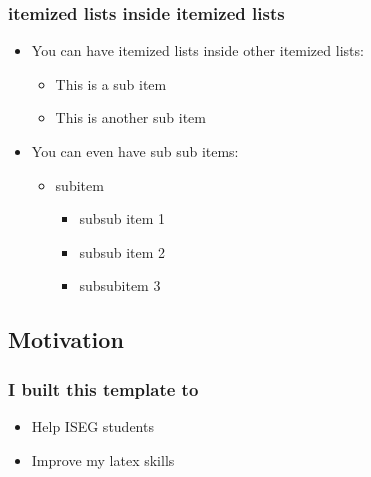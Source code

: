 \begin{frame}
	\frametitle{itemized lists inside itemized lists}
	
\begin{itemize}

\item You can have itemized lists inside other itemized lists:

\begin{itemize}

\item This is a sub item
\item This is another sub item

\end{itemize}

\item You can even have sub sub items:

\begin{itemize}

\item subitem

\begin{itemize}

\item subsub item 1
\item subsub item 2
\item subsubitem 3

\end{itemize}

\end{itemize}

\end{itemize}

\end{frame}


\subsection{Motivation}

\begin{frame}
	\frametitle{I built this template to}

\begin{itemize}

\item Help ISEG students

\item Improve my latex skills

\end{itemize}

\end{frame}

